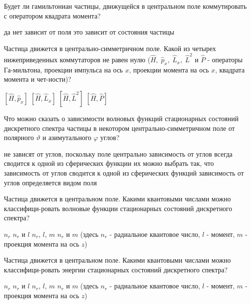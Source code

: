 \documentclass[11pt,a4paper]{exam}
\begin{document}
\begin{questions}
\question Будет ли гамильтониан частицы, движущейся в центральном поле коммутировать с оператором квадрата момента?
\begin{choices}
\choice да    
\choice нет      
\choice зависит от поля      
\choice это зависит от состояния частицы
\end{choices}

\question Частица движется в центрально-симметричном поле. Какой из четырех нижеприведенных коммутаторов не равен нулю ($\hat H,\;{\hat p_x},\;{\hat L_x},\;{\hat L^2}$ и $\hat P$ - операторы Га-мильтона, проекции импульса на ось $x$, проекции момента на ось $x$, квадрата момента и чет-ности)?
\begin{choices}
\choice $\left[ {\hat H,{{\hat p}_x}} \right]$       
\choice $\left[ {\hat H,{{\hat L}_x}} \right]$       
\choice $\left[ {\hat H,{{\hat L}^2}} \right]$       
\choice $\left[ {\hat H,\hat P} \right]$
\end{choices}

\question Что можно сказать о зависимости волновых функций стационарных состояний дискретного спектра частицы в некотором центрально-симметричном поле от полярного $\vartheta $ и азимутального $\varphi $ углов?
\begin{choices}
\choice не зависят от углов, поскольку поле центрально
\choice зависимость от углов всегда сводится к одной из сферических функции
\choice их можно выбрать так, что зависимость от углов сводится к одной из сферических функций
\choice зависимость от углов определяется видом поля
\end{choices}

\question Частица движется в центральном поле. Какими квантовыми числами можно классифици-ровать волновые функции стационарных состояний дискретного спектра?
\begin{choices}
\choice ${n_r}$        
\choice ${n_r}$ и $l$     
\choice ${n_r}$, $l$, $m$    
\choice ${n_r}$ и $m$
(здесь ${n_r}$ - радиальное квантовое число, $l$ - момент, $m$ - проекция момента на ось $z$)
\end{choices}

\question Частица движется в центральном поле. Какими квантовыми числами можно классифици-ровать энергии стационарных состояний дискретного спектра?
\begin{choices}
\choice ${n_r}$        
\choice ${n_r}$ и $l$     
\choice ${n_r}$, $l$, $m$    
\choice ${n_r}$ и $m$
(здесь ${n_r}$ - радиальное квантовое число, $l$ - момент, $m$ - проекция момента на ось $z$)
\end{choices}


\end{questions}
\end{document}
